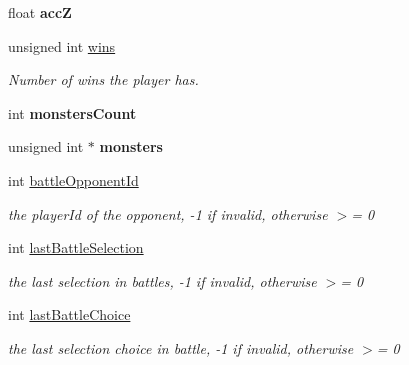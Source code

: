 \begin{DoxyCompactItemize}
\item 
\hypertarget{class_game_state_1_1_player_abec98fdec68ed34c3ff6bf202d4ac446}{float {\bfseries acc\-Z}}\label{class_game_state_1_1_player_abec98fdec68ed34c3ff6bf202d4ac446}

\item 
\hypertarget{class_game_state_1_1_player_aac7333a06ea194848f12090be762cdd6}{unsigned int \hyperlink{class_game_state_1_1_player_aac7333a06ea194848f12090be762cdd6}{wins}}\label{class_game_state_1_1_player_aac7333a06ea194848f12090be762cdd6}

\begin{DoxyCompactList}\small\item\em Number of wins the player has. \end{DoxyCompactList}\item 
\hypertarget{class_game_state_1_1_player_a7f5bbae042c927e8dd0f27a189a18dea}{int {\bfseries monsters\-Count}}\label{class_game_state_1_1_player_a7f5bbae042c927e8dd0f27a189a18dea}

\item 
\hypertarget{class_game_state_1_1_player_a2cc3642e98d820c6e4fce5864254c79e}{unsigned int $\ast$ {\bfseries monsters}}\label{class_game_state_1_1_player_a2cc3642e98d820c6e4fce5864254c79e}

\item 
\hypertarget{class_game_state_1_1_player_ae60a4f411ef984c6d649d98c65b274bd}{int \hyperlink{class_game_state_1_1_player_ae60a4f411ef984c6d649d98c65b274bd}{battle\-Opponent\-Id}}\label{class_game_state_1_1_player_ae60a4f411ef984c6d649d98c65b274bd}

\begin{DoxyCompactList}\small\item\em the player\-Id of the opponent, -\/1 if invalid, otherwise $>$= 0 \end{DoxyCompactList}\item 
\hypertarget{class_game_state_1_1_player_a2383ab7d3783c5122f3e68230069eb2e}{int \hyperlink{class_game_state_1_1_player_a2383ab7d3783c5122f3e68230069eb2e}{last\-Battle\-Selection}}\label{class_game_state_1_1_player_a2383ab7d3783c5122f3e68230069eb2e}

\begin{DoxyCompactList}\small\item\em the last selection in battles, -\/1 if invalid, otherwise $>$= 0 \end{DoxyCompactList}\item 
\hypertarget{class_game_state_1_1_player_adf61e3258c2170b7b66355389cca541f}{int \hyperlink{class_game_state_1_1_player_adf61e3258c2170b7b66355389cca541f}{last\-Battle\-Choice}}\label{class_game_state_1_1_player_adf61e3258c2170b7b66355389cca541f}

\begin{DoxyCompactList}\small\item\em the last selection choice in battle, -\/1 if invalid, otherwise $>$= 0 \end{DoxyCompactList}\end{DoxyCompactItemize}
